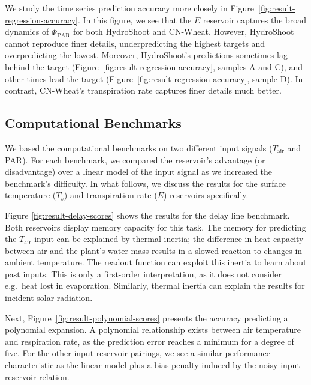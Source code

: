 \documentclass[10pt,a4paper,journal]{IEEEtran}
\begin{document}
We study the time series prediction accuracy more closely in \mbox{Figure \ref{fig:result-regression-accuracy}}.
In this figure, we see that the $E$ reservoir captures the broad dynamics of $\Phi_{\text{PAR}}$ for both HydroShoot and CN-Wheat.
However, HydroShoot cannot reproduce finer details, underpredicting the highest targets and overpredicting the lowest.
Moreover, HydroShoot's predictions sometimes lag behind the target (\mbox{Figure \ref{fig:result-regression-accuracy}}, samples A and C), and other times lead the target (\mbox{Figure \ref{fig:result-regression-accuracy}}, sample D).
In contrast, CN-Wheat's transpiration rate captures finer details much better.

\subsection{Computational Benchmarks}

We based the computational benchmarks on two different input signals ($T_\text{air}$ and PAR).
For each benchmark, we compared the reservoir's advantage (or disadvantage) over a linear model of the input signal as we increased the benchmark's difficulty.
In what follows, we discuss the results for the surface temperature ($T_s$) and transpiration rate ($E$) reservoirs specifically.

Figure \ref{fig:result-delay-scores} shows the results for the delay line benchmark.
Both reservoirs display memory capacity for this task.
The memory for predicting the $T_\text{air}$ input can be explained by thermal inertia; the difference in heat capacity between air and the plant's water mass results in a slowed reaction to changes in ambient temperature.
The readout function can exploit this inertia to learn about past inputs.
This is only a first-order interpretation, as it does not consider e.g.\ heat lost in evaporation.
Similarly, thermal inertia can explain the results for incident solar radiation.

Next, \mbox{Figure \ref{fig:result-polynomial-scores}} presents the accuracy predicting a polynomial expansion.
A polynomial relationship exists between air temperature and respiration rate, as the prediction error reaches a minimum for a degree of five.
For the other input-reservoir pairings, we see a similar performance characteristic as the linear model plus a bias penalty induced by the noisy input-reservoir relation.
\end{document}
